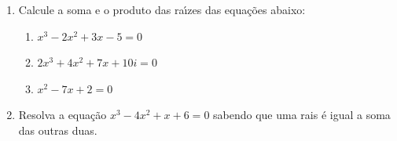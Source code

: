 \documentclass[a4paper,5pt]{amsbook}
\begin{document}
\begin{enumerate}
    \vspace{0.5cm}
    \item Calcule a soma e o produto das ra\'{\i}zes das equa\c{c}\~oes abaixo:
        \begin{enumerate}
            \vspace{0.3cm}
            \item $x^3-2x^2+3x-5=0$
            \vspace{0.3cm}
            \item $2x^3+4x^2+7x+10i=0$
            \vspace{0.3cm}
            \item $x^2-7x+2=0$
        \end{enumerate}

    \vspace{0.5cm}
    \item Resolva a equa\c{c}\~ao $x^3-4x^2+x+6=0$ sabendo que uma rais \'e igual a
        soma das outras duas.

\end{enumerate}
\end{document}
